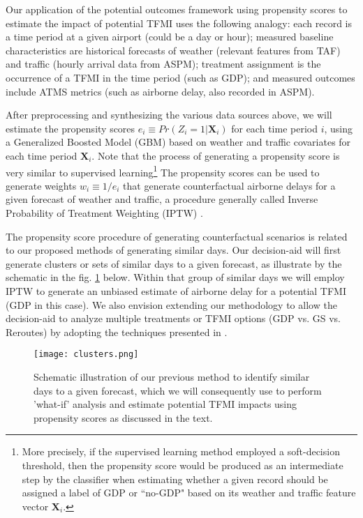 \documentclass[11pt]{scrartcl}
\begin{document}
Our application of the potential outcomes framework using propensity scores to estimate the impact of potential TFMI uses the following analogy: each record is a time period at a given airport (could be a day or hour); measured baseline characteristics are historical forecasts of weather (relevant features from TAF) and traffic (hourly arrival data from ASPM); treatment assignment is the occurrence of a TFMI in the time period (such as GDP); and measured outcomes include ATMS metrics (such as airborne delay, also recorded in ASPM).  

After preprocessing and synthesizing the various data sources above, we will estimate the propensity scores $e_i \equiv Pr(Z_i=1|\mathbf{X}_i)$ for each time period $i$, using a Generalized Boosted Model (GBM) \cite{ridgeway2015toolkit} based on weather and traffic covariates for each time period $\mathbf{X}_i$.  Note that the process of generating a propensity score is very similar to supervised learning\footnote{More precisely, if the supervised learning method employed a soft-decision threshold, then the propensity score would be produced as an intermediate step by the classifier when estimating whether a given record should be assigned a label of GDP or ``no-GDP" based on its weather and traffic feature vector $\mathbf{X}_i$.} The propensity scores can be used to generate weights $w_i \equiv 1/e_i$ that generate counterfactual airborne delays for a given forecast of weather and traffic, a procedure generally called Inverse Probability of Treatment Weighting (IPTW) \cite{austin2011introduction}.  

The propensity score procedure of generating counterfactual scenarios is related to our proposed methods of generating similar days.  Our decision-aid will first generate clusters or sets of similar days to a given forecast, as illustrate by the schematic in the fig. \ref{cluster} below.  Within that group of similar days we will employ IPTW to generate an unbiased estimate of airborne delay for a potential TFMI (GDP in this case).  We also envision extending our methodology to allow the decision-aid to analyze multiple treatments or TFMI options (GDP vs. GS vs. Reroutes) by adopting the techniques presented in \cite{mccaffrey2013tutorial}.  



\par\noindent
\newpage\noindent
\begin{figure}[h]
\begin{center}
\texttt{[image: clusters.png]}
\caption{Schematic illustration of our previous method to identify similar days to a given forecast, which we will consequently use to perform 'what-if' analysis and estimate potential TFMI impacts using propensity scores as discussed in the text.}
\label{cluster}
\end{center}
\end{figure}
\end{document}
